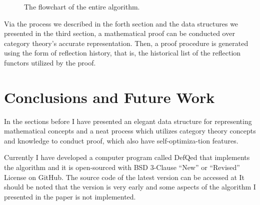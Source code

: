 \documentclass[preprint]{elsarticle}
\numberwithin{theorem}{section}	%
\numberwithin{axiom}{section}	%
\numberwithin{definition}{section}	%
\begin{document}
\begin{figure}[h!t]
	\caption{The flowchart of the entire algorithm.}
	\label{figure-3}
\end{figure}

Via the process we described in the forth section and the data structures we presented in the third section, a mathematical proof can be conducted over category theory{'}s accurate representation. Then, a proof procedure is generated using the form of reflection history, that is, the historical list of the reflection functors utilized by the proof.

\section{Conclusions and Future Work}

In the sections before I have presented an elegant data structure for representing mathematical concepts and a neat process which utilizes category theory concepts and knowledge to conduct proof, which also have self-optimiza-tion features.

Currently I have developed a computer program called DefQed that implements the algorithm and it is open-sourced with BSD 3-Clause {``}New{''} or {``}Revised{''} License on GitHub. The source code of the latest version can be accessed at \cite{Wang2022} It should be noted that the version is very early and some aspects of the algorithm I presented in the paper is not implemented.
\end{document}
